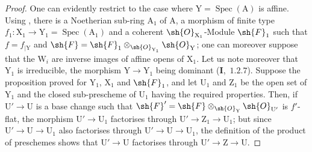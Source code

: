 \begin{proof}
One can evidently restrict to the case where $\mathrm{Y}=\operatorname{Spec}(\mathrm{A})$ is affine. Using
, there is a Noetherian sub-ring $\mathrm{A}_1$ of $\mathrm{A}$, a morphism of finite type
$f_1:\mathrm{X}_1\to\mathrm{Y}_1=\operatorname{Spec}(\mathrm{A}_1)$ and a coherent $\sh{O}_{\mathrm{X}_1}$-Module $\sh{F}_1$ such that $f=f_{|\mathrm{Y}}$ and $\sh{F}=\sh{F}_1\otimes_{\sh{O}_{\mathrm{Y}_1}}\sh{O}_\mathrm{Y}$;
one can moreover suppose that the $\mathrm{W}_i$ are inverse images of affine opens of $\mathrm{X}_1$.
Let us note moreover that $\mathrm{Y}_1$ is irreducible, the morphism $\mathrm{Y}\to\mathrm{Y}_1$ being dominant (\textbf{I},~$1.2.7$).
Suppose the proposition proved for $\mathrm{Y}_1$, $\mathrm{X}_1$ and $\sh{F}_1$, and let $\mathrm{U}_1$ and $\mathrm{Z}_1$ be the open set of $\mathrm{Y}_1$
and the closed sub-prescheme of $\mathrm{U}_1$ having the required properties. Then, if $\mathrm{U}'\to\mathrm{U}$ is a base change
such that $\sh{F}'=\sh{F}\otimes_{\sh{O}_\mathrm{Y}}\sh{O}_{\mathrm{U}'}$ is $f'$-flat, the morphism $\mathrm{U}'\to\mathrm{U}_1$ factorises
through $\mathrm{U}'\to\mathrm{Z}_1\to\mathrm{U}_1$; but since $\mathrm{U}'\to\mathrm{U}\to\mathrm{U}_1$ also factorises through $\mathrm{U}'\to\mathrm{U}\to\mathrm{U}_1$, the definition
of the product of preschemes shows that $\mathrm{U}'\to\mathrm{U}$ factorises through $\mathrm{U}'\to\mathrm{Z}\to\mathrm{U}$.


\end{proof}
